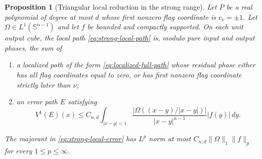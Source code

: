 \documentclass[11pt]{article}
\numberwithin{equation}{section}
\newtheorem{proposition}[theorem]{Proposition}
\theoremstyle{remark}
\theoremstyle{definition}
\newcommand{\Sph}{\mathbb S}
\newcommand{\norm}[1]{\lVert #1\rVert}
\begin{document}
\begin{proposition}[Triangular local reduction in the strong range]
\label{prop:strong-local-reduction}
Let $P$ be a real polynomial of degree at most $d$ whose first nonzero
flag coordinate is $c_\nu=\pm1$.  Let
$\Omega\in L^1(\Sph^{n-1})$ and let $f$ be bounded and compactly
supported.  On each unit output cube, the local path
\eqref{eq:strong-local-path} is, modulo
pure input and output phases, the sum of
\begin{enumerate}[label=\textup{(\roman*)}]
\item a localized path of the form \eqref{eq:localized-full-path} whose
residual phase either has all flag coordinates equal to zero, or has first
nonzero flag coordinate strictly later than \(\nu\);
\item an error path \(E\) satisfying
\begin{equation}\label{eq:strong-local-error}
 V^1(E)(x)\leq C_{n,d}
 \int_{|x-y|<1}
 \frac{|\Omega((x-y)/|x-y|)|}{|x-y|^{n-1}}|f(y)|\,dy.
\end{equation}
\end{enumerate}
The majorant in \eqref{eq:strong-local-error} has \(L^p\) norm at most
$C_{n,d}\norm\Omega_1\norm f_p$ for every \(1\leq p\leq\infty\).
\end{proposition}
\end{document}
